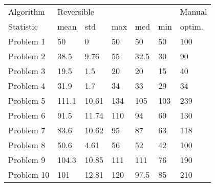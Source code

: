 \begin{tabular}{lllllll}
\toprule
Algorithm & \multicolumn{5}{l}{Reversible} & Manual \\
Statistic &       mean &    std &  max &   med &  min & optim. \\
\midrule
Problem 1  &         50 &      0 &   50 &    50 &   50 &    100 \\
Problem 2  &       38.5 &   9.76 &   55 &  32.5 &   30 &     90 \\
Problem 3  &       19.5 &    1.5 &   20 &    20 &   15 &     40 \\
Problem 4  &       31.9 &    1.7 &   34 &    33 &   29 &     34 \\
Problem 5  &      111.1 &  10.61 &  134 &   105 &  103 &    239 \\
Problem 6  &       91.5 &  11.74 &  110 &    94 &   69 &    130 \\
Problem 7  &       83.6 &  10.62 &   95 &    87 &   63 &    118 \\
Problem 8  &       50.6 &   4.61 &   56 &    52 &   42 &    100 \\
Problem 9  &      104.3 &  10.85 &  111 &   111 &   76 &    190 \\
Problem 10 &        101 &  12.81 &  120 &  97.5 &   85 &    210 \\
\bottomrule
\end{tabular}
